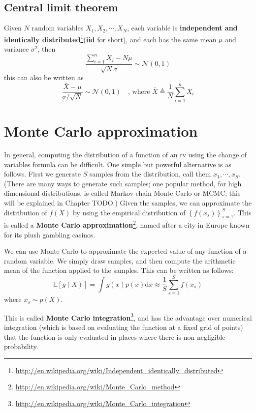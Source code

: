 \documentclass[graybox, envcountchap, twocolumn]{styles/svmult}
\begin{document}
{\subsection{Central limit theorem}
Given $N$ random variables $X_1,X_2,\cdots,X_N$, each variable is \textbf{independent and identically distributed}\footnote{\url{http://en.wikipedia.org/wiki/Independent_identically_distributed}}(\textbf{iid} for short), and each has the same mean $\mu$ and variance $\sigma^2$, then
\begin{equation}
\dfrac{\sum\limits_{i=1}^n X_i-N\mu}{\sqrt{N}\sigma} \sim \mathcal{N}(0,1)
\end{equation}
this can also be written as
\begin{equation}
\dfrac{\bar{X}-\mu}{\sigma/\sqrt{N}} \sim \mathcal{N}(0,1) \quad \text{, where } \bar{X} \triangleq \dfrac{1}{N}\sum\limits_{i=1}^n X_i
\end{equation}


\section{Monte Carlo approximation}
\label{sec:Monte-Carlo-approximation}
In general, computing the distribution of a function of an rv using the change of variables formula can be difficult. One simple but powerful alternative is as follows. First we generate $S$ samples from the distribution, call them $x_1,\cdots,x_S$. (There are many ways to generate such samples; one popular method, for high dimensional distributions, is called Markov chain Monte Carlo or MCMC; this will be explained in Chapter TODO.) Given the samples, we can approximate the distribution of $f(X)$ by using the empirical distribution of $\left\{f(x_s)\right\}_{s=1}^S$. This is called a \textbf{Monte Carlo approximation}\footnote{\url{http://en.wikipedia.org/wiki/Monte_Carlo_method}}, named after a city in Europe known for its plush gambling casinos.

We can use Monte Carlo to approximate the expected value of any function of a random variable. We simply draw samples, and then compute the arithmetic mean of the function applied to the samples. This can be written as follows:
\begin{equation}
\mathbb{E}[g(X)]=\int g(x)p(x)\mathrm{d}x \approx \dfrac{1}{S}\sum\limits_{s=1}^S f(x_s)
\end{equation}
where $x_s \sim p(X)$.

This is called \textbf{Monte Carlo integration}\footnote{\url{http://en.wikipedia.org/wiki/Monte_Carlo_integration}}, and has the advantage over numerical integration (which is based on evaluating the function at a fixed grid of points) that the function is only evaluated in places where there is non-negligible probability.


}
\end{document}
